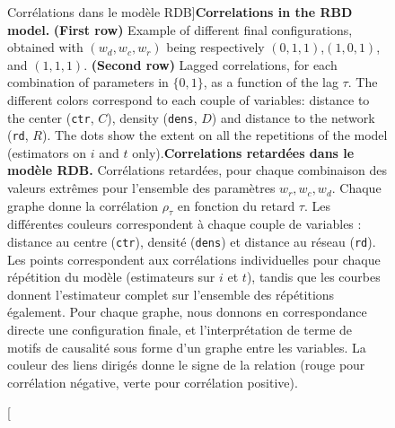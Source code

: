 \begin{figure}
\caption[Correlation in the RBD model][Corrélations dans le modèle RDB]{\textbf{Correlations in the RBD model.} \textbf{(First row)} Example of different final configurations, obtained with $(w_{d},w_{c},w_{r})$ being respectively $(0,1,1)$,$(1,0,1)$, and $(1,1,1)$. \textbf{(Second row)} Lagged correlations, for each combination of parameters in $\{0,1\}$, as a function of the lag $\tau$. The different colors correspond to each couple of variables: distance to the center (\texttt{ctr}, $C$), density (\texttt{dens}, $D$) and distance to the network (\texttt{rd}, $R$). The dots show the extent on all the repetitions of the model (estimators on $i$ and $t$ only).\label{fig:causalityregimes:exrdb}}{\textbf{Correlations retardées dans le modèle RDB.} Corrélations retardées, pour chaque combinaison des valeurs extrêmes pour l'ensemble des paramètres $w_r,w_c,w_d$. Chaque graphe donne la corrélation $\rho_{\tau}$ en fonction du retard $\tau$. Les différentes couleurs correspondent à chaque couple de variables : distance au centre (\texttt{ctr}), densité (\texttt{dens}) et distance au réseau (\texttt{rd}). Les points correspondent aux corrélations individuelles pour chaque répétition du modèle (estimateurs sur $i$ et $t$), tandis que les courbes donnent l'estimateur complet sur l'ensemble des répétitions également. Pour chaque graphe, nous donnons en correspondance directe une configuration finale, et l'interprétation de terme de motifs de causalité sous forme d'un graphe entre les variables. La couleur des liens dirigés donne le signe de la relation (rouge pour corrélation négative, verte pour corrélation positive).\label{fig:causalityregimes:exrdb}}
\end{figure}




